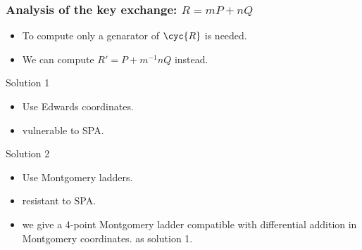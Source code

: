 \documentclass{beamer}
\renewcommand{\emph}[1]{}
\begin{document}

\begin{frame}
  \frametitle{Analysis of the key exchange: $R=mP+nQ$}

  \begin{itemize}
  \item To compute \emph{$\phi:E\to E/\cyc{R}$} only a
    \alert{genarator of $\cyc{R}$} is needed.
  \item We can compute \alert{$R'=P + m^{-1}nQ$} instead.
  \end{itemize}

  \begin{block}{Solution 1}
    \begin{itemize}
    \item Use Edwards coordinates.
    \item \emph{Drawback:} vulnerable to SPA.
    \end{itemize}
  \end{block}
  
  \begin{block}{Solution 2}
    \begin{itemize}
    \item Use Montgomery ladders.
    \item \emph{Security:} resistant to SPA.
    \item \emph{Efficiency:} we give a \alert{4-point Montgomery
        ladder} compatible with \alert{differential addition} in
      Montgomery coordinates. \emph{Nearly as efficient} as solution
      1.
    \end{itemize}
  \end{block}
\end{frame}

\end{document}
